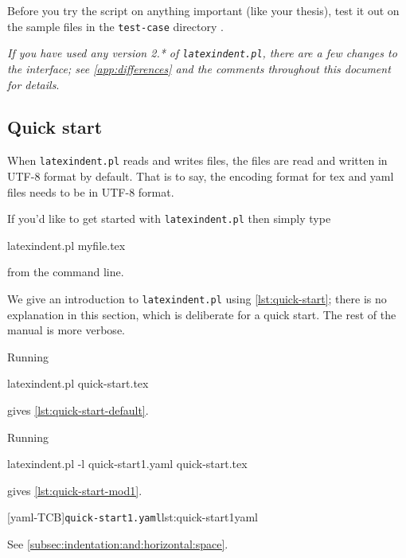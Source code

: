  \begin{warning}
  Before you try the script on anything important (like your thesis), test it out on the
  sample files in the \texttt{test-case} directory \cite{latexindent-home}.
 \end{warning}

 \emph{If you have used any version 2.* of \texttt{latexindent.pl}, there
 are a few changes to the interface; see \vref{app:differences} and the comments
 throughout this document for details}.

\subsection{Quick start}\label{sec:quickstart}
 When \texttt{latexindent.pl} reads and writes files, the files are read and written in UTF-8 format by default.
 That is to say, the encoding format for tex and yaml files needs to be in UTF-8 format.

 If you'd like to get started with \texttt{latexindent.pl} then simply type

 \begin{commandshell}
latexindent.pl myfile.tex
\end{commandshell}

 from the command line.

 We give an introduction to \texttt{latexindent.pl} using \cref{lst:quick-start}; there
 is no explanation in this section, which is deliberate for a quick start. The rest of
 the manual is more verbose.


 Running

 \begin{commandshell}
latexindent.pl quick-start.tex
\end{commandshell}

 gives \cref{lst:quick-start-default}.


 \begin{example}
 Running

 \begin{commandshell}
latexindent.pl -l quick-start1.yaml quick-start.tex
\end{commandshell}

 gives \cref{lst:quick-start-mod1}.

 \begin{cmhtcbraster}
  [yaml-TCB]{\texttt{quick-start1.yaml}}{lst:quick-start1yaml}
 \end{cmhtcbraster}
 See \cref{subsec:indentation:and:horizontal:space}.
 \end{example}

